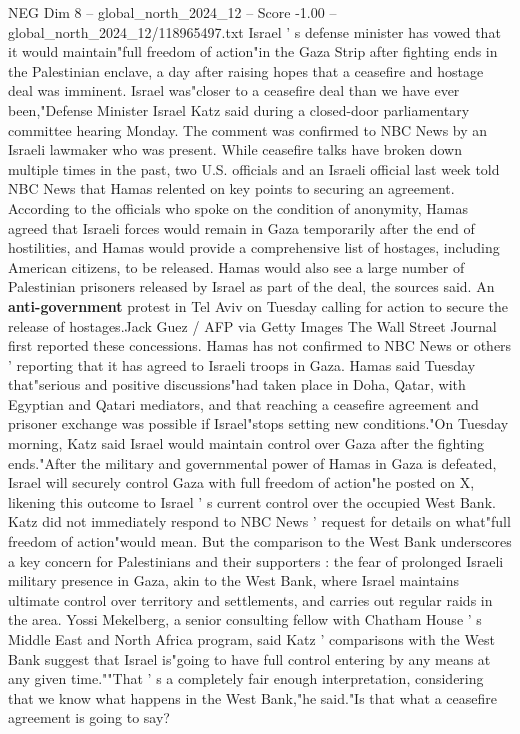 \begin{textsample}{NEG Dim 8 – global\_north\_2024\_12 – Score -1.00 – global\_north\_2024\_12/118965497.txt}  \label{ex:f8_neg_351}
Israel ' s defense minister has vowed that it would maintain"full freedom of action"in the Gaza Strip after fighting ends in the Palestinian enclave, a day after raising hopes that a ceasefire and hostage deal was imminent.
Israel was"closer to a ceasefire deal than we have ever been,"Defense Minister Israel Katz said during a closed-door parliamentary committee hearing Monday.
The comment was confirmed to NBC News by an Israeli lawmaker who was present.
While ceasefire talks have broken down multiple times in the past, two U.S. officials and an Israeli official last week told NBC News that Hamas relented on key points to securing an agreement.
According to the officials who spoke on the condition of anonymity, Hamas agreed that Israeli forces would remain in Gaza temporarily after the end of hostilities, and Hamas would provide a comprehensive list of hostages, including American citizens, to be released.
Hamas would also see a large number of Palestinian prisoners released by Israel as part of the deal, the sources said.
An \textbf{anti-government} protest in Tel Aviv on Tuesday calling for action to secure the release of hostages.Jack Guez / AFP via Getty Images The Wall Street Journal first reported these concessions.
Hamas has not confirmed to NBC News or others ' reporting that it has agreed to Israeli troops in Gaza.
Hamas said Tuesday that"serious and positive discussions"had taken place in Doha, Qatar, with Egyptian and Qatari mediators, and that reaching a ceasefire agreement and prisoner exchange was possible if Israel"stops setting new conditions."On Tuesday morning, Katz said Israel would maintain control over Gaza after the fighting ends."After the military and governmental power of Hamas in Gaza is defeated, Israel will securely control Gaza with full freedom of action"he posted on X, likening this outcome to Israel ' s current control over the occupied West Bank.
Katz did not immediately respond to NBC News ' request for details on what"full freedom of action"would mean.
But the comparison to the West Bank underscores a key concern for Palestinians and their supporters : the fear of prolonged Israeli military presence in Gaza, akin to the West Bank, where Israel maintains ultimate control over territory and settlements, and carries out regular raids in the area.
Yossi Mekelberg, a senior consulting fellow with Chatham House ' s Middle East and North Africa program, said Katz ' comparisons with the West Bank suggest that Israel is"going to have full control entering by any means at any given time.""That ' s a completely fair enough interpretation, considering that we know what happens in the West Bank,"he said."Is that what a ceasefire agreement is going to say?

\end{textsample}
